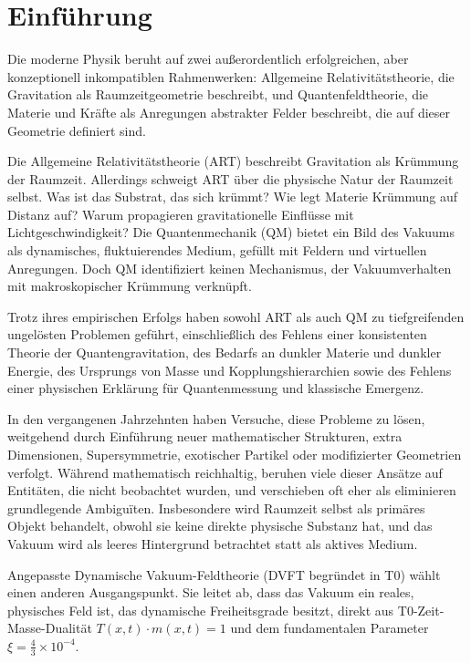 	\section{Einführung}
	
	Die moderne Physik beruht auf zwei außerordentlich erfolgreichen, aber konzeptionell inkompatiblen Rahmenwerken:
	Allgemeine Relativitätstheorie, die Gravitation als Raumzeitgeometrie beschreibt, und Quantenfeldtheorie, die Materie und Kräfte als Anregungen abstrakter Felder beschreibt, die auf dieser Geometrie definiert sind.
	
	Die Allgemeine Relativitätstheorie (ART) beschreibt Gravitation als Krümmung der Raumzeit.
	Allerdings schweigt ART über die physische Natur der Raumzeit selbst.
	Was ist das Substrat, das sich krümmt?
	Wie legt Materie Krümmung auf Distanz auf?
	Warum propagieren gravitationelle Einflüsse mit Lichtgeschwindigkeit?
	Die Quantenmechanik (QM)
	bietet ein Bild des Vakuums als dynamisches, fluktuierendes Medium, gefüllt mit Feldern und virtuellen Anregungen.
	Doch QM identifiziert keinen Mechanismus, der Vakuumverhalten mit makroskopischer Krümmung verknüpft.
	
	Trotz ihres empirischen Erfolgs haben sowohl ART als auch QM zu tiefgreifenden ungelösten Problemen geführt, einschließlich
	des Fehlens einer konsistenten Theorie der Quantengravitation, des Bedarfs an dunkler Materie und dunkler Energie, des Ursprungs
	von Masse und Kopplungshierarchien sowie des Fehlens einer physischen Erklärung für Quantenmessung und
	klassische Emergenz.
	
	In den vergangenen Jahrzehnten haben Versuche, diese Probleme zu lösen, weitgehend durch Einführung neuer mathematischer Strukturen, extra Dimensionen, Supersymmetrie, exotischer Partikel oder modifizierter Geometrien verfolgt.
	Während mathematisch reichhaltig, beruhen viele dieser Ansätze auf Entitäten, die nicht beobachtet wurden, und verschieben oft eher als eliminieren grundlegende Ambiguïten.
	Insbesondere wird Raumzeit selbst als primäres Objekt behandelt, obwohl sie keine direkte physische Substanz hat, und das Vakuum wird als leeres Hintergrund betrachtet statt als aktives Medium.
	
	Angepasste Dynamische Vakuum-Feldtheorie (DVFT begründet in T0) wählt einen anderen Ausgangspunkt.
	Sie leitet ab, dass das Vakuum ein reales, physisches Feld ist, das dynamische Freiheitsgrade besitzt, direkt aus T0-Zeit-Masse-Dualität $T(x,t) \cdot m(x,t) = 1$ und dem fundamentalen Parameter $\xi = \frac{4}{3} \times 10^{-4}$.
	
